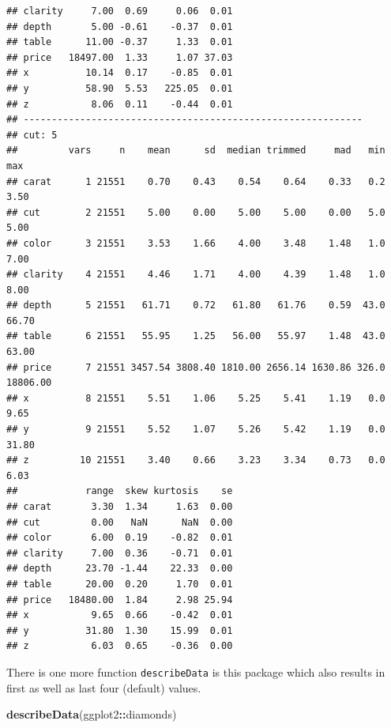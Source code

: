 \documentclass[
]{book}
\newenvironment{Shaded}{\begin{snugshade}}{\end{snugshade}}
\newcommand{\FunctionTok}[1]{\textcolor[rgb]{0.13,0.29,0.53}{\textbf{#1}}}
\newcommand{\NormalTok}[1]{#1}
\newcommand{\SpecialCharTok}[1]{\textcolor[rgb]{0.81,0.36,0.00}{\textbf{#1}}}
\begin{document}
\begin{verbatim}
## clarity     7.00  0.69     0.06  0.01
## depth       5.00 -0.61    -0.37  0.01
## table      11.00 -0.37     1.33  0.01
## price   18497.00  1.33     1.07 37.03
## x          10.14  0.17    -0.85  0.01
## y          58.90  5.53   225.05  0.01
## z           8.06  0.11    -0.44  0.01
## ------------------------------------------------------------ 
## cut: 5
##         vars     n    mean      sd  median trimmed     mad   min      max
## carat      1 21551    0.70    0.43    0.54    0.64    0.33   0.2     3.50
## cut        2 21551    5.00    0.00    5.00    5.00    0.00   5.0     5.00
## color      3 21551    3.53    1.66    4.00    3.48    1.48   1.0     7.00
## clarity    4 21551    4.46    1.71    4.00    4.39    1.48   1.0     8.00
## depth      5 21551   61.71    0.72   61.80   61.76    0.59  43.0    66.70
## table      6 21551   55.95    1.25   56.00   55.97    1.48  43.0    63.00
## price      7 21551 3457.54 3808.40 1810.00 2656.14 1630.86 326.0 18806.00
## x          8 21551    5.51    1.06    5.25    5.41    1.19   0.0     9.65
## y          9 21551    5.52    1.07    5.26    5.42    1.19   0.0    31.80
## z         10 21551    3.40    0.66    3.23    3.34    0.73   0.0     6.03
##            range  skew kurtosis    se
## carat       3.30  1.34     1.63  0.00
## cut         0.00   NaN      NaN  0.00
## color       6.00  0.19    -0.82  0.01
## clarity     7.00  0.36    -0.71  0.01
## depth      23.70 -1.44    22.33  0.00
## table      20.00  0.20     1.70  0.01
## price   18480.00  1.84     2.98 25.94
## x           9.65  0.66    -0.42  0.01
## y          31.80  1.30    15.99  0.01
## z           6.03  0.65    -0.36  0.00
\end{verbatim}

There is one more function \texttt{describeData} is this package which also results in first as well as last four (default) values.

\begin{Shaded}
\begin{Highlighting}[]
\FunctionTok{describeData}\NormalTok{(ggplot2}\SpecialCharTok{::}\NormalTok{diamonds)}
\end{Highlighting}
\end{Shaded}
\end{document}
